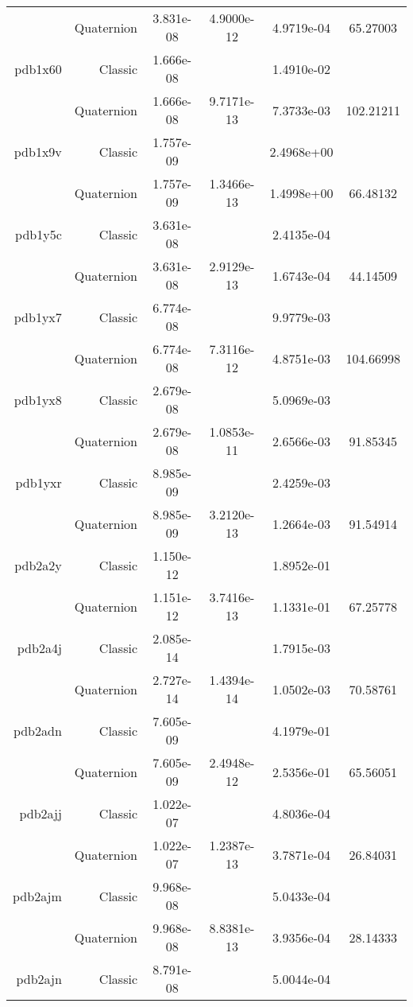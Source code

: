 \begin{xltabular}{\textwidth}{r|rS[table-format=1.3e+2]S[table-format=1.4e+2]S[table-format=1.4e+2]S[table-format=-1.5]}
& Quaternion & 3.831e-08 & 4.9000e-12 & 4.9719e-04 & 65.27003\\  \addlinespace
pdb1x60 & Classic & 1.666e-08 &  & 1.4910e-02 & \\
& Quaternion & 1.666e-08 & 9.7171e-13 & 7.3733e-03 & 102.21211\\  \addlinespace
pdb1x9v & Classic & 1.757e-09 &  & 2.4968e+00 & \\
& Quaternion & 1.757e-09 & 1.3466e-13 & 1.4998e+00 & 66.48132\\  \addlinespace
pdb1y5c & Classic & 3.631e-08 &  & 2.4135e-04 & \\
& Quaternion & 3.631e-08 & 2.9129e-13 & 1.6743e-04 & 44.14509\\  \addlinespace
pdb1yx7 & Classic & 6.774e-08 &  & 9.9779e-03 & \\
& Quaternion & 6.774e-08 & 7.3116e-12 & 4.8751e-03 & 104.66998\\  \addlinespace
pdb1yx8 & Classic & 2.679e-08 &  & 5.0969e-03 & \\
& Quaternion & 2.679e-08 & 1.0853e-11 & 2.6566e-03 & 91.85345\\  \addlinespace
pdb1yxr & Classic & 8.985e-09 &  & 2.4259e-03 & \\
& Quaternion & 8.985e-09 & 3.2120e-13 & 1.2664e-03 & 91.54914\\  \addlinespace
pdb2a2y & Classic & 1.150e-12 &  & 1.8952e-01 & \\
& Quaternion & 1.151e-12 & 3.7416e-13 & 1.1331e-01 & 67.25778\\  \addlinespace
pdb2a4j & Classic & 2.085e-14 &  & 1.7915e-03 & \\
& Quaternion & 2.727e-14 & 1.4394e-14 & 1.0502e-03 & 70.58761\\  \addlinespace
pdb2adn & Classic & 7.605e-09 &  & 4.1979e-01 & \\
& Quaternion & 7.605e-09 & 2.4948e-12 & 2.5356e-01 & 65.56051\\  \addlinespace
pdb2ajj & Classic & 1.022e-07 &  & 4.8036e-04 & \\
& Quaternion & 1.022e-07 & 1.2387e-13 & 3.7871e-04 & 26.84031\\  \addlinespace
pdb2ajm & Classic & 9.968e-08 &  & 5.0433e-04 & \\
& Quaternion & 9.968e-08 & 8.8381e-13 & 3.9356e-04 & 28.14333\\  \addlinespace
pdb2ajn & Classic & 8.791e-08 &  & 5.0044e-04 & \\

\end{xltabular}

